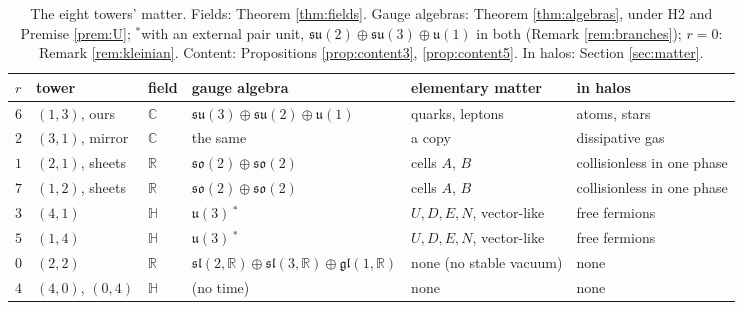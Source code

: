 \documentclass[11pt]{article}
\theoremstyle{definition}
\newcommand{\R}{\mathbb{R}}
\newcommand{\C}{\mathbb{C}}
\newcommand{\HH}{\mathbb{H}}
\newcommand{\su}{\mathfrak{su}}
\newcommand{\so}{\mathfrak{so}}
\newcommand{\uu}{\mathfrak{u}}
\newcommand{\sll}{\mathfrak{sl}}
\newcommand{\gl}{\mathfrak{gl}}
\begin{document}
\begin{table}[ht]\centering\small\setlength{\tabcolsep}{4pt}
\begin{tabular}{@{}llllll@{}}
\toprule
$r$ & tower & field & gauge algebra & elementary matter & in halos \\
\midrule
$6$ & $(1,3)$, ours & $\C$ & $\su(3) \oplus \su(2) \oplus \uu(1)$ & quarks, leptons & atoms, stars \\
$2$ & $(3,1)$, mirror & $\C$ & the same & a copy & dissipative gas \\
$1$ & $(2,1)$, sheets & $\R$ & $\so(2) \oplus \so(2)$ & cells $A$, $B$ & collisionless in one phase \\
$7$ & $(1,2)$, sheets & $\R$ & $\so(2) \oplus \so(2)$ & cells $A$, $B$ & collisionless in one phase \\
$3$ & $(4,1)$ & $\HH$ & $\uu(3)$\,$^{*}$ & $U, D, E, N$, vector-like & free fermions \\
$5$ & $(1,4)$ & $\HH$ & $\uu(3)$\,$^{*}$ & $U, D, E, N$, vector-like & free fermions \\
$0$ & $(2,2)$ & $\R$ & $\sll(2,\R) \oplus \sll(3,\R) \oplus \gl(1,\R)$ & none (no stable vacuum) & none \\
$4$ & $(4,0)$, $(0,4)$ & $\HH$ & (no time) & none & none \\
\bottomrule
\end{tabular}
\caption{The eight towers' matter. Fields: Theorem \ref{thm:fields}. Gauge algebras: Theorem \ref{thm:algebras}, under H2 and Premise \ref{prem:U}; $^{*}$with an external pair unit, $\su(2) \oplus \su(3) \oplus \uu(1)$ in both (Remark \ref{rem:branches}); $r = 0$: Remark \ref{rem:kleinian}. Content: Propositions \ref{prop:content3}, \ref{prop:content5}. In halos: Section \ref{sec:matter}.}
\label{tab:summary}
\end{table}
\end{document}
